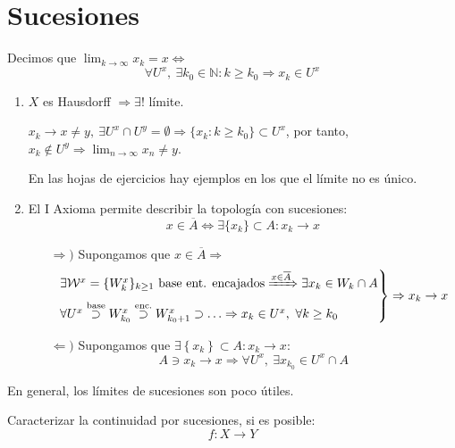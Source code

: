 \section{Sucesiones}
\label{sub:sucesiones}
\begin{defi}[Límites]
Decimos que $\lim_{k \rightarrow \infty} x_k = x \Leftrightarrow$ 
\[
\forall U^x,\ \exists k_0 \in \mathbb{N}: k \ge k_0 \Rightarrow x_k \in U^x
\]
\end{defi}
\begin{obs}
\begin{enumerate}
    \item $X$ es Hausdorff $\Rightarrow \exists! $ límite. 
    \begin{demo}    
    $x_k \rightarrow x \neq y,\ \exists U^x \cap U^y = \emptyset \Rightarrow \{x_k : k \ge k_0\} \subset U^x$, por tanto, $x_k \not\in U^y \Rightarrow \lim_{n \rightarrow \infty} x_n \neq y$.
    \end{demo}
    En las hojas de ejercicios hay ejemplos en los que el límite no es único.

    \item El I Axioma permite describir la topología con sucesiones:
    \[
     x \in \overline{A} \Leftrightarrow \exists \{x_k\} \subset A: x_k \rightarrow x
    \]

    \begin{demo}
    \begin{itemize}
        \item[$\Rightarrow)$] Supongamos que $x \in \overline{A} \Rightarrow$
        \[
        \begin{rcases}
            \exists \mathcal{W}^x = \{W_k^x\}_{k \ge 1} \text{ base ent. encajados} \xRightarrow{x \in \overline{A}} \exists x_k \in W_k \cap A\\
            \forall U^x \stackrel{\text{base}}{\supset} W_{k_0}^x \stackrel{\text{enc.}}{\supset} W_{k_0 + 1}^x \supset \ldots \Rightarrow x_k \in U^x,\ \forall k \ge k_0  
        \end{rcases} \Rightarrow x_k \rightarrow x
        \]
        \item[$\Leftarrow)$] Supongamos que $\exists \left\{ x_k \right\} \subset A: x_k \rightarrow x$:
        \[
        A \ni x_k \rightarrow x \Rightarrow \forall U^x,\ \exists x_{k_0} \in U^x \cap A
        \]
    \end{itemize}
    \end{demo}
\end{enumerate}
En general, los límites de sucesiones son poco útiles.
\end{obs}

\begin{enun}
Caracterizar la continuidad por sucesiones, si es posible:
\[
f: X \rightarrow Y
\]
\end{enun}

